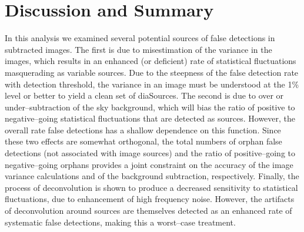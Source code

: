 \documentclass[iop]{emulateapj}
\begin{document}
\section{Discussion and Summary}




In this analysis we examined several potential sources of false detections in subtracted images.
The first is due to misestimation of the variance in the images, which results in an enhanced (or deficient) rate of statistical fluctuations masquerading as variable sources.
Due to the steepness of the false detection rate with detection threshold, the variance in an image must be understood at the 1\% level or better to yield a clean set of diaSources.
The second is due to over or under--subtraction of the sky background, which will bias the ratio of positive to negative--going statistical fluctuations that are detected as sources.
However, the overall rate false detections has a shallow dependence on this function.
Since these two effects are somewhat orthogonal, the total numbers of orphan false detections (not associated with image sources) and the ratio of positive--going to negative--going orphans provides a joint constraint on the accuracy of the image variance calculations and of the background subtraction, respectively.
Finally, the process of deconvolution is shown to produce a decreased sensitivity to statistical fluctuations, due to enhancement of high frequency noise.
However, the artifacts of deconvolution around sources are themselves detected as an enhanced rate of systematic false detections, making this a worst--case treatment.
\end{document}
